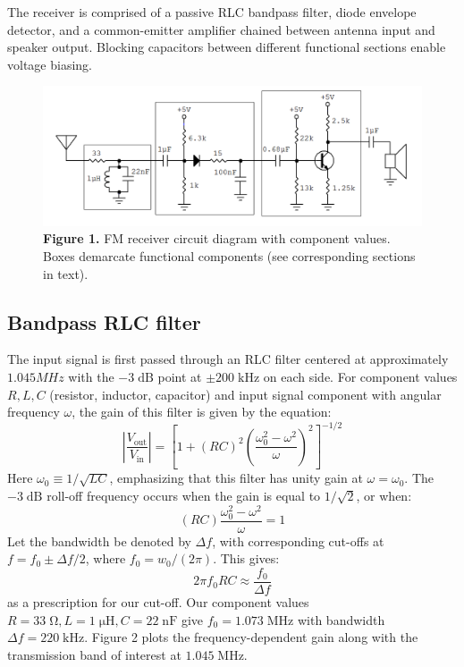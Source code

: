 \documentclass[11pt]{article}
\newcommand {\mt}{\mathrm}
\newcommand {\unit}[1]{\; \mt{#1}}
\begin{document}
The receiver is comprised of a passive RLC bandpass filter, diode envelope
detector, and a common-emitter amplifier chained between antenna input and
speaker output.  Blocking capacitors between different functional sections
enable voltage biasing.

\begin{figure}[h]
    \centering
    \includegraphics[scale=0.5]{schematics/receiver_box.png} \\
    \textbf{Figure 1.} FM receiver circuit diagram with component values.\\
    Boxes demarcate functional components (see corresponding sections in text).
\end{figure}

\subsection{Bandpass RLC filter}

The input signal is first passed through an RLC filter centered at
approximately $1.045 MHz$ with the $-3 \unit{dB}$ point at $\pm 200 \unit{kHz}$
on each side.  For component values $R, L, C$ (resistor, inductor, capacitor)
and input signal component with angular frequency $\omega$, the gain of this
filter is given by the equation:
\[
  \left| \frac{V_{\mt{out}}}{V_{\mt{in}}} \right| =
    \left[
      1 + (RC)^2 \left(\frac{\omega_0^2 - \omega^2}{\omega}\right)^2
    \right]^{-1/2}
\]
Here $\omega_0 \equiv 1 / \sqrt{LC}$, emphasizing that this filter has unity
gain at $\omega = \omega_0$.  The $-3 \unit{dB}$ roll-off frequency occurs
when the gain is equal to $1/\sqrt{2}$, or when:
\[
  (RC) \frac{\omega_0^2-\omega^2}{\omega} = 1
\]
Let the bandwidth be denoted by $\Delta f$, with corresponding cut-offs at
$f = f_0 \pm \Delta f /2$, where $f_0 = w_0/(2\pi)$.  This gives:
\[
  2 \pi f_0 RC \approx \frac{f_0}{\Delta f}
\]
as a prescription for our cut-off.  Our component values $R = 33 \unit{\Omega},
L = 1 \unit{\mu H}, C = 22 \unit{nF}$ give $f_0 = 1.073 \unit{MHz}$ with
bandwidth $\Delta f = 220 \unit{kHz}$.  Figure 2 plots the frequency-dependent
gain along with the transmission band of interest at $1.045 \unit{MHz}$.
\end{document}
